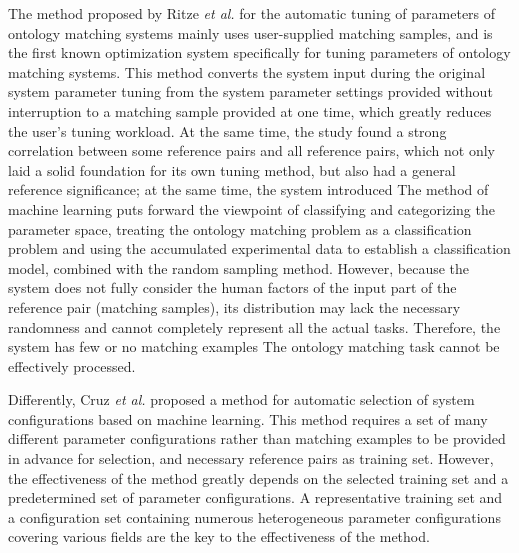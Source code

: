 \documentclass[twoside]{article}
\begin{document}
\begin{multicols}{2}
The method proposed by Ritze {\it et al.} for the automatic tuning of parameters of ontology matching systems\cite{wwy49} mainly uses user-supplied matching samples, and is the first known optimization system specifically for tuning parameters of ontology matching systems. 
This method converts the system input during the original system parameter tuning from the system parameter settings provided without interruption to a matching sample provided at one time, which greatly reduces the user's tuning workload.
At the same time, the study found a strong correlation between some reference pairs and all reference pairs, which not only laid a solid foundation for its own tuning method, but also had a general reference significance; at the same time, the system introduced The method of machine learning puts forward the viewpoint of classifying and categorizing the parameter space, treating the ontology matching problem as a classification problem and using the accumulated experimental data to establish a classification model, combined with the random sampling method. 
However, because the system does not fully consider the human factors of the input part of the reference pair (matching samples), its distribution may lack the necessary randomness and cannot completely represent all the actual tasks. Therefore, the system has few or no matching examples The ontology matching task cannot be effectively processed.

Differently, Cruz {\it et al.}\cite{wwy50} proposed a method for automatic selection of system configurations based on machine learning. This method requires a set of many different parameter configurations rather than matching examples to be provided in advance for selection, and necessary reference pairs as training set.
However, the effectiveness of the method greatly depends on the selected training set and a predetermined set of parameter configurations. A representative training set and a configuration set containing numerous heterogeneous parameter configurations covering various fields are the key to the effectiveness of the method.



\end{multicols}
\end{document}
